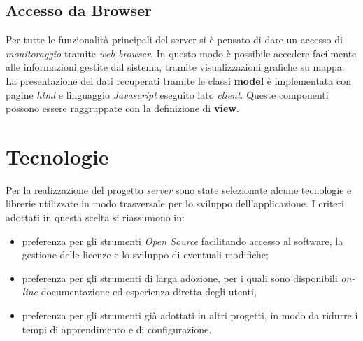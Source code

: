 \subsection{Accesso da Browser}
Per tutte le funzionalità principali del server si è pensato di dare un accesso di \emph{monitoraggio} tramite \emph{web browser}. In questo modo è possibile accedere facilmente alle informazioni gestite dal sistema, tramite visualizzazioni grafiche su mappa. La presentazione dei dati recuperati tramite le classi \textbf{model} è implementata con pagine \emph{html} e linguaggio \emph{Javascript} eseguito lato \emph{client}. Queste componenti possono essere raggruppate con la definizione di \textbf{view}.

\section{Tecnologie}
Per la realizzazione del progetto \emph{server} sono state selezionate alcune tecnologie e librerie utilizzate in modo trasversale per lo sviluppo dell'applicazione. I criteri adottati in questa scelta si riassumono in:
\begin{itemize}
\item preferenza per gli strumenti \emph{Open Source} facilitando accesso al software, la gestione delle licenze e lo sviluppo di eventuali modifiche;
\item preferenza per gli strumenti di larga adozione, per i quali sono disponibili \emph{on-line} documentazione ed esperienza diretta degli utenti,
\item preferenza per gli strumenti già adottati in altri progetti, in modo da ridurre i tempi di apprendimento e di configurazione.
\end{itemize}


